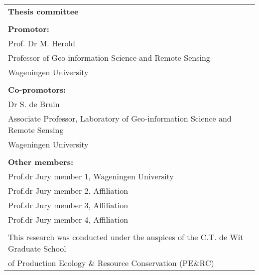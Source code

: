 \begin{tabular}{l}
    \textbf{Thesis committee}                                                                 \\  
                                                                                              \\  
    \textbf{Promotor:}                                                                        \\  
    Prof. Dr M. Herold                                                                        \\  
    Professor of Geo-information Science and Remote Sensing                                   \\  
    Wageningen University                                                                     \\  
                                                                                              \\  
    \textbf{Co-promotors:}                                                                    \\  
    Dr S. de Bruin                                                                           \\  
    Associate Professor, Laboratory of Geo-information Science and Remote Sensing             \\  
    Wageningen University                                                                     \\  
                                                                                              \\  

    \textbf{Other members:}                                                                   \\  
    Prof.dr Jury member 1, Wageningen University                                              \\  
    Prof.dr Jury member 2, Affiliation                                                        \\  
    Prof.dr Jury member 3, Affiliation                                                        \\  
    Prof.dr Jury member 4, Affiliation                                                        \\  
                                                                                              \\  

    \small{This research was conducted under the auspices of the C.T. de Wit Graduate School} \\  
    \small{of Production Ecology \& Resource Conservation (PE$\&$RC)}                         \\  
\end{tabular}

